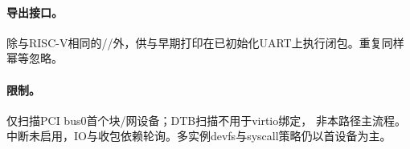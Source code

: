 \paragraph{导出接口。}除与RISC-V相同的//外，供与早期打印在已初始化UART上执行闭包。重复同样幂等忽略。

\paragraph{限制。}仅扫描PCI bus0首个块/网设备；DTB扫描不用于virtio绑定， 非本路径主流程。中断未启用，IO与收包依赖轮询。多实例devfs与syscall策略仍以首设备为主。
